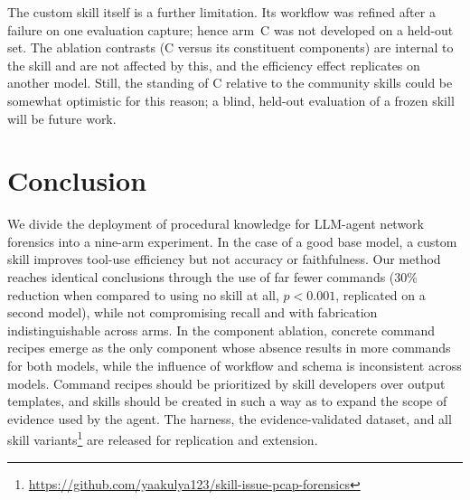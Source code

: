 \documentclass[conference]{IEEEtran}
\newcommand{\num}[1]{#1} %
\begin{document}
The custom skill itself is a further limitation. Its workflow was refined after a failure on
one evaluation capture; hence arm~C was not developed on a held-out set. The ablation
contrasts (C versus its constituent components) are internal to the skill and are not
affected by this, and the efficiency effect replicates on another model. Still, the standing
of C relative to the community skills could be somewhat optimistic for this reason; a blind,
held-out evaluation of a frozen skill will be future work.

\section{Conclusion}
We divide the deployment of procedural knowledge for LLM-agent network forensics into a
nine-arm experiment. In the case of a good base model, a custom skill improves tool-use
efficiency but not accuracy or faithfulness. Our method reaches identical conclusions
through the use of far fewer commands (\num{30}\% reduction when compared to using no skill
at all, $p{<}0.001$, replicated on a second model), while not compromising recall and with
fabrication indistinguishable across arms. In the component ablation, concrete command
recipes emerge as the only component whose absence results in more commands for both
models, while the influence of workflow and schema is inconsistent across models. Command
recipes should be prioritized by skill developers over output templates, and skills should
be created in such a way as to expand the scope of evidence used by the agent. The harness,
the evidence-validated dataset, and all skill
variants\footnote{\url{https://github.com/yaakulya123/skill-issue-pcap-forensics}} are
released for replication and extension.



\end{document}
